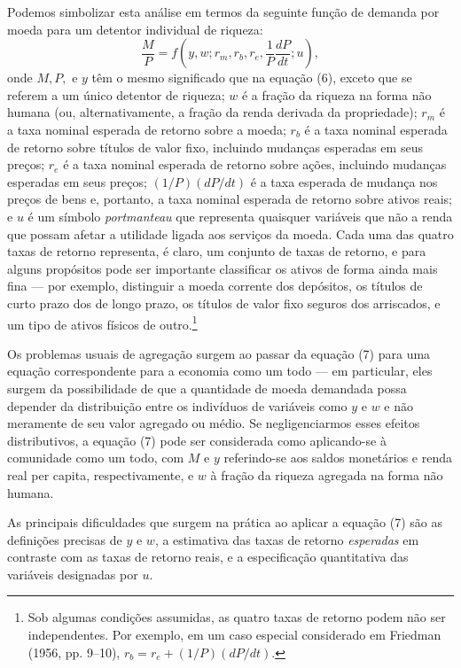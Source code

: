 \documentclass[12pt]{article}
\begin{document}
Podemos simbolizar esta análise em termos da seguinte função de demanda por moeda para um detentor individual de riqueza:
\begin{equation}
\frac{M}{P} = f\left( y, w; r_m, r_b, r_e, \frac{1}{P}\frac{dP}{dt}; u \right),
\end{equation}
onde $M, P,$ e $y$ têm o mesmo significado que na equação (6), exceto que se referem a um único detentor de riqueza; $w$ é a fração da riqueza na forma não humana (ou, alternativamente, a fração da renda derivada da propriedade); $r_m$ é a taxa nominal esperada de retorno sobre a moeda; $r_b$ é a taxa nominal esperada de retorno sobre títulos de valor fixo, incluindo mudanças esperadas em seus preços; $r_e$ é a taxa nominal esperada de retorno sobre ações, incluindo mudanças esperadas em seus preços; $(1/P)(dP/dt)$ é a taxa esperada de mudança nos preços de bens e, portanto, a taxa nominal esperada de retorno sobre ativos reais; e $u$ é um símbolo \textit{portmanteau} que representa quaisquer variáveis que não a renda que possam afetar a utilidade ligada aos serviços da moeda. Cada uma das quatro taxas de retorno representa, é claro, um conjunto de taxas de retorno, e para alguns propósitos pode ser importante classificar os ativos de forma ainda mais fina — por exemplo, distinguir a moeda corrente dos depósitos, os títulos de curto prazo dos de longo prazo, os títulos de valor fixo seguros dos arriscados, e um tipo de ativos físicos de outro.\footnote{Sob algumas condições assumidas, as quatro taxas de retorno podem não ser independentes. Por exemplo, em um caso especial considerado em Friedman (1956, pp. 9–10), $r_b = r_e + (1/P)(dP/dt)$.}

Os problemas usuais de agregação surgem ao passar da equação (7) para uma equação correspondente para a economia como um todo — em particular, eles surgem da possibilidade de que a quantidade de moeda demandada possa depender da distribuição entre os indivíduos de variáveis como $y$ e $w$ e não meramente de seu valor agregado ou médio. Se negligenciarmos esses efeitos distributivos, a equação (7) pode ser considerada como aplicando-se à comunidade como um todo, com $M$ e $y$ referindo-se aos saldos monetários e renda real per capita, respectivamente, e $w$ à fração da riqueza agregada na forma não humana.

As principais dificuldades que surgem na prática ao aplicar a equação (7) são as definições precisas de $y$ e $w$, a estimativa das taxas de retorno \textit{esperadas} em contraste com as taxas de retorno reais, e a especificação quantitativa das variáveis designadas por $u$.
\end{document}
